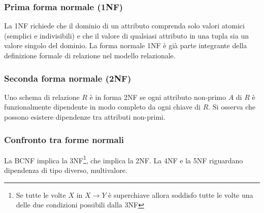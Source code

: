 \subsubsection{Prima forma normale (1NF)}
La 1NF richiede che il dominio di un attributo comprenda solo valori atomici (semplici e indivisibili) e che il valore di qualsiasi attributo in una tupla sia un valore singolo del dominio. La forma normale 1NF è già parte integrante della definizione formale di relazione nel modello relazionale.

\subsubsection{Seconda forma normale (2NF)}
Uno schema di relazione $R$ è in forma 2NF se ogni attributo non-primo $A$ di $R$ è funzionalmente dipendente in modo completo da ogni chiave di $R$. Si osserva che possono esistere dipendenze tra attributi non-primi.

\subsubsection{Confronto tra forme normali}
La BCNF implica la 3NF\footnote{Se tutte le volte $X$ in $X\to Y$ è superchiave allora soddisfo tutte le volte una delle due condizioni possibili dalla 3NF}, che implica la 2NF. La 4NF e la 5NF riguardano dipendenza di tipo diverso, multivalore.